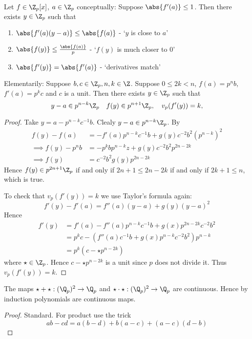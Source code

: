 \begin{prop}
    Let $f \in \Z_p[x]$, $a \in \Z_p$
    conceptually:
    Suppose $\abs{f'(a)} \le 1$.
    Then there exists $y \in \Z_p$ such that
    \begin{enumerate}
        \item $\abs{f'(a)(y - a)} \le \abs{f(a)}$  - `$y$ is close to $a$'
        \item $\abs{f(y)} \le \frac{\abs{f(a)}}{p}$ - `$f(y)$ is much closer to $0$'
        \item $\abs{f'(y)} = \abs{f'(a)}$ - `derivatives match'
    \end{enumerate}

    Elementarily:
    Suppose $b,c \in \Z_p, n, k \in \Z$.
    Suppose $0 \le 2k < n$, $f(a) = p^n b$, $f'(a) = p^{k} c$ 
    and $c$ is a unit.
    Then there exists $y \in \Z_p$ such that 
    \[
        y - a \in p^{n-k} \Z_p \quad
        f(y) \in p^{n+1} \Z_p, \quad v_p(f'(y)) = k, 
    \]
\end{prop}
\begin{proof}
    Take $y = a - p^{n-k} c^{-1} b$.
    Clealy $y - a \in p^{n-k} \Z_p $.
    By 
    \begin{align*}
        f(y) - f(a) &=  
        - f'(a) p^{n-k} c^{-1} b + g(y) c^{-2} b^2 (p^{n-k})^2\\
        \implies f(y) - p^n b &= - p^{k} b p^{n-k} z + 
        g(y) c^{-2} b^2 p^{2n - 2k}\\
        \implies f(y) &= c^{-2} b^2 g(y) p^{2n - 2k}
    \end{align*}
    Hence $f(y) \in p^{2n + 1} \Z_p$ if and only if
    $2n + 1 \le 2n - 2k$ if and only if $2k + 1 \le n$,
    which is true.

    To check that  $v_p(f'(y)) = k$ we use Taylor's formula again:
    \[f'(y) - f'(a) = f''(a)(y - a) + g(y) (y - a)^2\]
    Hence 
    \begin{align*}
        f'(y) &= 
        f'(a) - f''(a) p^{n-k} c^{-1} b + g(x)p^{2n-2k}c^{-2}b^2\\
        &= p^k c - (f''(a) c^{-1} b + g(x)p^{n-k}c^{-2}b^2)p^{n-k}\\
        &= p^k (c - \star p^{n-2k})
    \end{align*}
    where $\star \in \Z_p$.
    Hence $c - \star p^{n-2k}$ is a unit since $p$ does not divide it.
    Thus $v_p(f'(y)) = k$. 
\end{proof}

\begin{prop}
    The maps $\star + \star : (\Q_p)^2 \to \Q_p$ and 
    $\star \cdot \star : (\Q_p)^2 \to \Q_p$ are continuous.
    Hence by induction polynomials are continuous maps.
\end{prop}
\begin{proof}
    Standard.
    For product use the trick
    \[ab - cd = a(b - d) + b(a - c) +(a - c)(d - b)\]
\end{proof}

